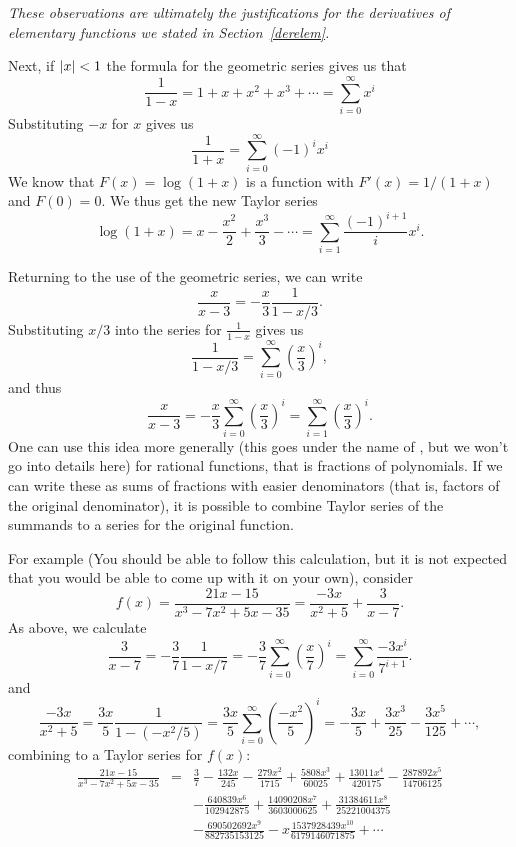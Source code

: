 {\em These observations are ultimately the
justifications for the derivatives of elementary functions we stated in
Section~\ref{derelem}.}
\smallskip

Next, if $\left|x\right|<1$ the formula for the geometric series gives us that
\[
\frac{1}{1-x}=1+x+x^2+x^3+\cdots=\sum_{i=0}^\infty x^i
\]
Substituting $-x$ for $x$ gives us
\[
\frac{1}{1+x}=\sum_{i=0}^\infty (-1)^i x^i
\]
We know that $F(x)=\log(1+x)$ is a function with $F'(x)=1/(1+x)$ and
$F(0)=0$. We thus get the new Taylor series
\[
\log(1+x)=x-\frac{x^2}{2}+\frac{x^3}{3}-\cdots=\sum_{i=1}^\infty\frac{(-1)^{i+1}}{i}x^i.
\]
\smallskip

Returning to the use of the geometric series, we can write
\[
\frac{x}{x-3}=-\frac{x}{3}\frac{1}{1-x/3}.
\]
Substituting $x/3$ into the series for $\frac{1}{1-x}$ gives us
\[
\frac{1}{1-x/3}=\sum_{i=0}^\infty \left(\frac{x}{3}\right)^i,
\]
and thus
\[
\frac{x}{x-3}= -\frac{x}{3}\sum_{i=0}^\infty \left(\frac{x}{3}\right)^i
= \sum_{i=1}^\infty \left(\frac{x}{3}\right)^i.
\]
One can use this idea more generally (this goes under the name of
, but we won't go into details here) for rational
functions, that is fractions of polynomials. If we can write these as sums
of fractions with easier denominators (that is, factors of the original
denominator), it is possible to combine Taylor series of the summands to a
series for the original function.

For example (You should be able to follow this calculation, but it is not
expected that you would be able to come up with it on your own), consider
\[
f(x)=\frac{21x-15}{x^3-7x^2+5x-35}=\frac{-3x}{x^2+5}+\frac{3}{x-7}.
\]
As above, we calculate
\[
\frac{3}{x-7}=-\frac{3}{7}\frac{1}{1-x/7}=-\frac{3}{7}
\sum_{i=0}^\infty \left(\frac{x}{7}\right)^i
=\sum_{i=0}^\infty \frac{-3x^i}{7^{i+1}}.
\]
and
\[
\frac{-3x}{x^2+5}=\frac{3x}{5}\frac{1}{1-(-x^2/5)}=\frac{3x}{5}
\sum_{i=0}^\infty \left(\frac{-x^2}{5}\right)^i
=-\frac{3x}{5}
+\frac{3x^3}{25}
-\frac{3x^5}{125}+\cdots,
\]
combining to a Taylor series for $f(x)$:
\begin{eqnarray*}
\frac{21x-15}{x^3-7x^2+5x-35}&=&
\frac{3}{7}-\frac{132 x}{245}-\frac{279 x^{2}}{1715}+\frac{5808
x^{3}}{60025}+\frac{13011 x^{4}}{420175}-\frac{287892 x^{5}}{14706125}\\
&&-\frac{640839 x^{6}}{102942875}+\frac{14090208 x^{7}}{3603000625}
+\frac{31384611 x^{8}}{25221004375}\\
&&-\frac{690502692 x^{9}}{882735153125}-
x\frac{1537928439 x^{10}}{6179146071875}
+\cdots
\end{eqnarray*}





